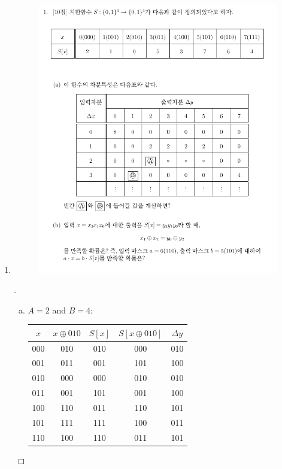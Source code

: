 \begin{enumerate}[\bf 1.]
	\item[]
	\begin{figure}[h!]\centering
		\includegraphics[scale=.525]{final2023-1}
	\end{figure}
	\begin{proof}[\sol]
		\begin{enumerate}[(a)]
			\item $A=2$ and  $B=4$: \begin{center}
				\begin{tabular}{cc|cc|c}
					\toprule[1.2pt]
					$x$ & $x \oplus 010$ & $S[x]$ & $S[x\oplus 010]$ & $\Delta y$\\ \hline
					000 & 010 & 010 & 000 & 010 \\
					001 & 011 & 001 & 101 & 100 \\
					010 & 000 & 000 & 010 & 010 \\
					011 & 001 & 101 & 001 & 100 \\
					100 & 110 & 011 & 110 & 101 \\
					101 & 111 & 111 & 100 & 011 \\
					110 & 100 & 110 & 011 & 101 \\

\end{tabular}
\end{center}
\end{enumerate}
\end{proof}
\end{enumerate}
